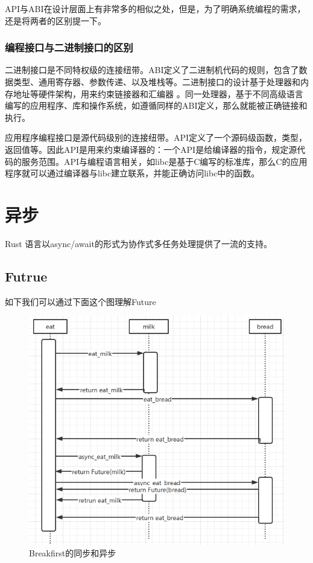 API与ABI在设计层面上有非常多的相似之处，但是，为了明确系统编程的需求，还是将两者的区别提一下。

\subsubsection*{编程接口与二进制接口的区别}

二进制接口是不同特权级的连接纽带。ABI定义了二进制机代码的规则，包含了数据类型、通用寄存器、参数传递、以及堆栈等。二进制接口的设计基于处理器和内存地址等硬件架构，用来约束链接器和汇编器 。同一处理器，基于不同高级语言编写的应用程序、库和操作系统，如遵循同样的ABI定义，那么就能被正确链接和执行。

应用程序编程接口是源代码级别的连接纽带。API定义了一个源码级函数，类型，返回值等。因此API是用来约束编译器的：一个API是给编译器的指令，规定源代码的服务范围。API与编程语言相关，如libc是基于C编写的标准库，那么C的应用程序就可以通过编译器与libc建立联系，并能正确访问libc中的函数。

\section{异步}

Rust 语言以async/await的形式为协作式多任务处理提供了一流的支持。

\subsection{Futrue}

如下我们可以通过下面这个图理解Future

\begin{figure}[htb]
    \figureCapSet
    \centering
    \includegraphics[width=.8\linewidth]{figure/c2/breakfirstsequence.png}
    \caption{Breakfirst的同步和异步}
    \label{figure:c2breakfirstsequence}
\end{figure}

